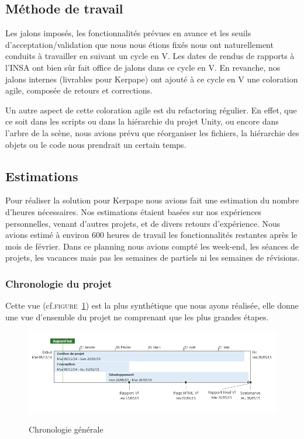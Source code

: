 \subsection{Méthode de travail}

Les jalons imposés, les fonctionnalités prévues en avance et les seuils d'acceptation/validation que nous nous étions fixés nous ont naturellement conduits à travailler en suivant un cycle en V.
Les dates de rendus de rapports à l'INSA ont bien sûr fait office de jalons dans ce cycle en V.
En revanche, nos jalons internes (livrables pour Kerpape) ont ajouté à ce cycle en V une coloration agile, composée de retours et corrections.

Un autre aspect de cette coloration agile est du refactoring régulier.
En effet, que ce soit dans les scripts ou dans la hiérarchie du projet Unity, ou encore dans l'arbre de la scène, nous avions prévu que réorganiser les fichiers, la hiérarchie des objets ou le code nous prendrait un certain temps.

\subsection{Estimations}

Pour réaliser la solution pour Kerpape nous avions fait une estimation du nombre d'heures nécessaires.
Nos estimations étaient basées sur nos expériences personnelles, venant d'autres projets, et de divers retours d'expérience.
Nous avions estimé à environ 600 heures de travail les fonctionnalités restantes après le mois de février.
Dans ce planning nous avions compté les week-end, les séances de projets, les vacances mais pas les semaines de partiels ni les semaines de révisions.

\subsubsection{Chronologie du projet}
Cette vue (cf.\textsc{figure~\ref{fig:timeline}}) est la plus synthétique que nous ayons réalisée, elle donne une vue d'ensemble du projet ne comprenant que les plus grandes étapes. 
\begin{figure}[h]
	\centering
	\caption{Chronologie générale}
		\includegraphics[width=\textwidth]{8-BilanPlanification/img/timeline.PNG}
	\label{fig:timeline}
\end{figure}

